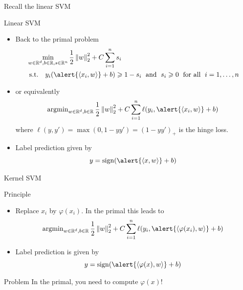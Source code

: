 \documentclass[xcolor={usenames,dvipsnames}]{beamer}
\begin{document}
\begin{frame}{Recall the linear SVM}  
\begin{block}{Linear SVM}

\begin{itemize}
\item  Back to the primal problem
  \begin{align*}
    &\min_{w \in \R^d, b \in \R, s \in \R^n} \frac 12 \norm{w}_2^2 
    + C \sum_{i=1}^n s_i \\
    &\text{ s.t. } \;\;  y_i (\alert{\inr{x_i, w}} + b) \geq 1 - s_i \; 
    \text{ and } \; s_i \geq 0 \; \text{ for all }  \;i=1, \ldots, n
  \end{align*}
\item   or equivalently
  \begin{equation*}
    \argmin_{w \in \R^d, b \in \R} \frac 12 \norm{w}_2^2 + C 
    \sum_{i=1}^n \ell(y_i, \alert{\inr{x_i, w}} + b)
  \end{equation*}
  where $\ell(y, y') = \max(0, 1 - y y') = (1 - y y')_+$ is the hinge loss.
\item Label prediction given by
  \begin{equation*}
    y = \sign(\alert{\inr{x, w}} + b)
  \end{equation*}
  \end{itemize}
    \end{block}
    
    \end{frame}
%  
%  
%



\begin{frame}{Kernel SVM}
  
  \begin{block}{Principle}
  \begin{itemize}
  \item Replace $x_i$ by $\varphi(x_i)$. In the primal this leads to
  \begin{equation*}
    \argmin_{w \in \R^d, b \in \R} \frac 12 \norm{w}_2^2 + C 
    \sum_{i=1}^n \ell(y_i, \alert{\inr{\varphi(x_i), w}} + b)
  \end{equation*}
  \medskip
  \item Label prediction is given by
  \begin{equation*}
    y = \sign(\alert{\inr{\varphi(x), w}} + b)
  \end{equation*}  
  \end{itemize}
  \end{block}
  
  \begin{alertblock}{Problem}
  In the primal, you need to compute $\varphi(x)$!
  \end{alertblock}
 \end{frame}
\end{document}
